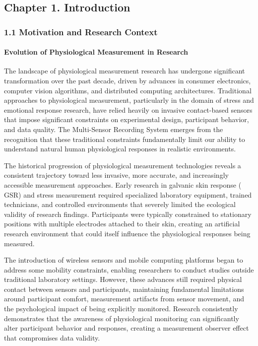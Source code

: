 \documentclass[12pt,a4paper]{report}
\begin{document}
\subsection{Chapter 1. Introduction}

\subsubsection{1.1 Motivation and Research Context}

\paragraph{Evolution of Physiological Measurement in Research}

The landscape of physiological measurement research has undergone significant transformation over the past decade,
driven by advances in consumer electronics, computer vision algorithms, and distributed computing architectures.
Traditional approaches to physiological measurement, particularly in the domain of stress and emotional response
research, have relied heavily on invasive contact-based sensors that impose significant constraints on experimental
design, participant behavior, and data quality. The Multi-Sensor Recording System emerges from the recognition that
these traditional constraints fundamentally limit our ability to understand natural human physiological responses in
realistic environments.

The historical progression of physiological measurement technologies reveals a consistent trajectory toward less
invasive, more accurate, and increasingly accessible measurement approaches. Early research in galvanic skin response (
GSR) and stress measurement required specialized laboratory equipment, trained technicians, and controlled environments
that severely limited the ecological validity of research findings. Participants were typically constrained to
stationary positions with multiple electrodes attached to their skin, creating an artificial research environment that
could itself influence the physiological responses being measured.

The introduction of wireless sensors and mobile computing platforms began to address some mobility constraints, enabling
researchers to conduct studies outside traditional laboratory settings. However, these advances still required physical
contact between sensors and participants, maintaining fundamental limitations around participant comfort, measurement
artifacts from sensor movement, and the psychological impact of being explicitly monitored. Research consistently
demonstrates that the awareness of physiological monitoring can significantly alter participant behavior and responses,
creating a measurement observer effect that compromises data validity.
\end{document}
